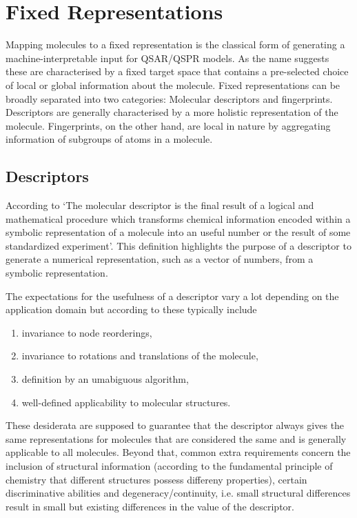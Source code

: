 \section{Fixed Representations}
\label{sec:fixed_rep}
Mapping molecules to a fixed representation is the classical form of generating a machine-interpretable input for QSAR/QSPR models. As the name suggests these are characterised by a fixed target space that contains a pre-selected choice of local or global information about the molecule.  Fixed representations can be broadly separated into two categories: Molecular descriptors and fingerprints. Descriptors are generally characterised by a more holistic representation of the molecule. Fingerprints, on the other hand, are local in nature by aggregating information of subgroups of atoms in a molecule.

\subsection{Descriptors}
According to \cite{todeschini2008handbook} `The molecular descriptor is the final result of a logical and mathematical procedure which transforms chemical information encoded within a symbolic representation of a molecule into an useful number or the result of some standardized experiment'. This definition highlights the purpose of a descriptor to generate a numerical representation, such as a vector of numbers, from a symbolic representation.

The expectations for the usefulness of a descriptor vary a lot depending on the application domain but according to \cite{Mauri2016} these typically include
\begin{enumerate}
	\item invariance to node reorderings,
	\item invariance to rotations and translations of the molecule,
	\item definition by an umabiguous algorithm,
	\item well-defined applicability to molecular structures.
\end{enumerate}
These desiderata are supposed to guarantee that the descriptor always gives the same representations for molecules that are considered the same and is generally applicable to all molecules. Beyond that, common extra requirements concern the inclusion of structural information (according to the fundamental principle of chemistry that different structures possess differeny properties), certain discriminative abilities and degeneracy/continuity, i.e. small structural differences result in small but existing differences in the value of the descriptor. 

